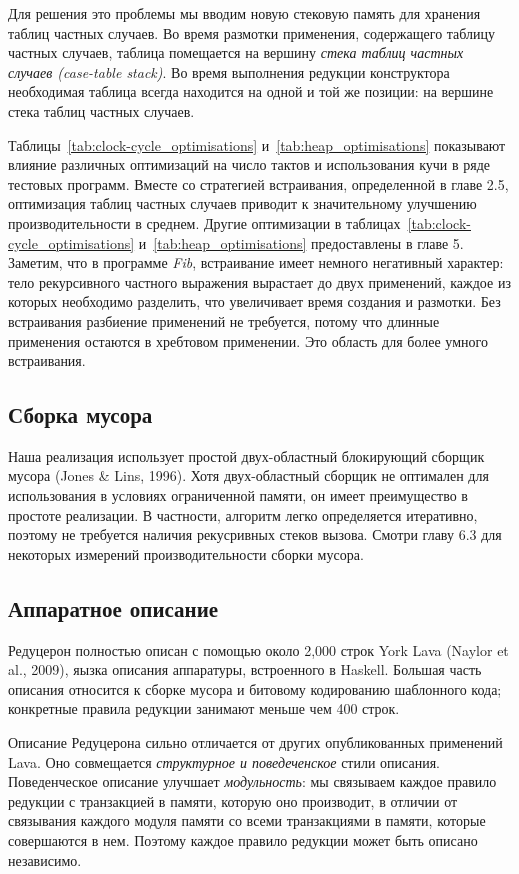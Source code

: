 \documentclass[flenqn, 14pt]{extarticle}
\begin{document}
Для решения это проблемы мы вводим новую стековую память для хранения таблиц частных случаев. Во время размотки применения, содержащего таблицу частных случаев, таблица помещается на вершину \textit{стека таблиц частных случаев (case-table stack)}. Во время выполнения редукции конструктора необходимая таблица всегда находится на одной и той же позиции: на вершине стека таблиц частных случаев.

Таблицы~\ref{tab:clock-cycle_optimisations} и~\ref{tab:heap_optimisations} показывают влияние различных оптимизаций на число тактов и использования кучи в ряде тестовых программ. Вместе со стратегией встраивания, определенной в главе 2.5, оптимизация таблиц частных случаев приводит к значительному улучшению производительности в среднем. Другие оптимизации в таблицах~\ref{tab:clock-cycle_optimisations} и~\ref{tab:heap_optimisations} предоставлены в главе 5. Заметим, что в программе \textit{Fib}, встраивание имеет немного негативный характер: тело рекурсивного частного выражения вырастает до двух применений, каждое из которых необходимо разделить, что увеличивает время создания и размотки. Без встраивания разбиение применений не требуется, потому что длинные применения остаются в хребтовом применении. Это область для более умного встраивания.

\subsection{Сборка мусора}
Наша реализация использует простой двух-областный блокирующий сборщик мусора (Jones & Lins, 1996). Хотя двух-областный сборщик не оптимален для использования в условиях ограниченной памяти, он имеет преимущество в простоте реализации. В частности, алгоритм легко определяется итеративно, поэтому не требуется наличия рекусривных стеков вызова. Смотри главу 6.3 для некоторых измерений производительности сборки мусора.

\subsection{Аппаратное описание}
Редуцерон полностью описан с помощью около 2,000 строк York Lava (Naylor et al., 2009), яызка описания аппаратуры, встроенного в Haskell. Большая часть описания относится к сборке мусора и битовому кодированию шаблонного кода; конкретные правила редукции занимают меньше чем 400 строк.

Описание Редуцерона сильно отличается от других опубликованных применений Lava. Оно совмещается \textit{структурное и поведеченское} стили описания. Поведенческое описание улучшает \textit{модульность}: мы связываем каждое правило редукции с транзакцией в памяти, которую оно производит, в отличии от связывания каждого модуля памяти со всеми транзакциями в памяти, которые совершаются в нем. Поэтому каждое правило редукции может быть описано независимо. 
\end{document}
